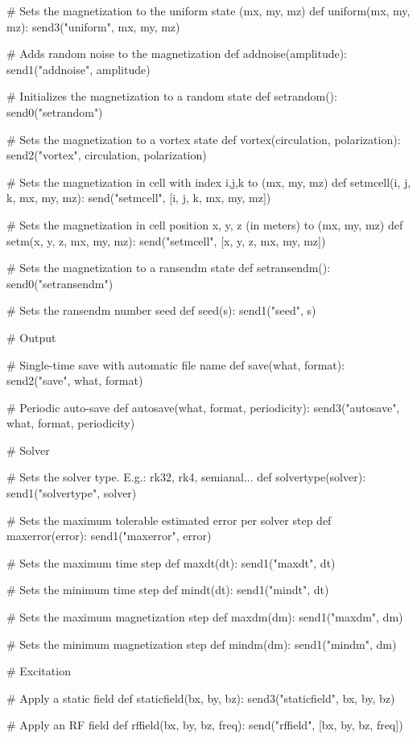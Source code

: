 # Sets the magnetization to the uniform state (mx, my, mz)
def uniform(mx, my, mz):
	send3("uniform", mx, my, mz)

# Adds random noise to the magnetization
def addnoise(amplitude):
	send1("addnoise", amplitude)

# Initializes the magnetization to a random state
def setrandom():
	send0("setrandom")

# Sets the magnetization to a vortex state
def vortex(circulation, polarization):
	send2("vortex", circulation, polarization)

# Sets the magnetization in cell with index i,j,k to (mx, my, mz)
def setmcell(i, j, k, mx, my, mz):
	send("setmcell", [i, j, k, mx, my, mz])

# Sets the magnetization in cell position x, y, z (in meters) to (mx, my, mz)
def setm(x, y, z, mx, my, mz):
	send("setmcell", [x, y, z, mx, my, mz])

# Sets the magnetization to a ransendm state
def setransendm():
	send0("setransendm")

# Sets the ransendm number seed
def seed(s):
	send1("seed", s)

# Output

# Single-time save with automatic file name
def save(what, format):
	send2("save", what, format)

# Periodic auto-save
def autosave(what, format, periodicity):
	send3("autosave", what, format, periodicity)


# Solver

# Sets the solver type. E.g.: rk32, rk4, semianal...
def solvertype(solver):
	send1("solvertype", solver)

# Sets the maximum tolerable estimated error per solver step
def maxerror(error):
	send1("maxerror", error)

# Sets the maximum time step 
def maxdt(dt):
	send1("maxdt", dt)

# Sets the minimum time step 
def mindt(dt):
	send1("mindt", dt)

# Sets the maximum magnetization step 
def maxdm(dm):
	send1("maxdm", dm)

# Sets the minimum magnetization step 
def mindm(dm):
	send1("mindm", dm)

# Excitation

# Apply a static field
def staticfield(bx, by, bz):
	send3("staticfield", bx, by, bz)

# Apply an RF field
def rffield(bx, by, bz, freq):
	send("rffield", [bx, by, bz, freq])

